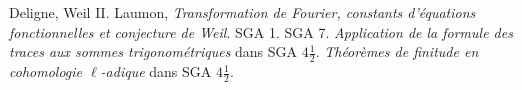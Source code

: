 \documentclass[deligne.tex]{subfiles}
\begin{document}
\begin{thebibliography}{Sommes trig.}
	 Deligne, Weil II.
	 Laumon, \emph{Transformation de Fourier, constants d'équations fonctionnelles et conjecture de Weil}.
	 SGA 1.
	 SGA 7.
	 \textit{Application de la formule des traces aux sommes trigonométriques}
	dans SGA $4\frac12$.
	 \textit{Théorèmes de finitude en cohomologie $\ell$-adique}
	dans SGA $4\frac12$.
\end{thebibliography}
\end{document}
